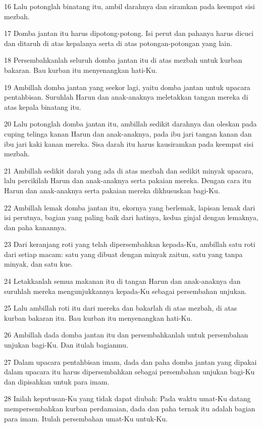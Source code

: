 \par 16 Lalu potonglah binatang itu, ambil darahnya dan siramkan pada keempat sisi mezbah.
\par 17 Domba jantan itu harus dipotong-potong. Isi perut dan pahanya harus dicuci dan ditaruh di atas kepalanya serta di atas potongan-potongan yang lain.
\par 18 Persembahkanlah seluruh domba jantan itu di atas mezbah untuk kurban bakaran. Bau kurban itu menyenangkan hati-Ku.
\par 19 Ambillah domba jantan yang seekor lagi, yaitu domba jantan untuk upacara pentahbisan. Suruhlah Harun dan anak-anaknya meletakkan tangan mereka di atas kepala binatang itu.
\par 20 Lalu potonglah domba jantan itu, ambillah sedikit darahnya dan oleskan pada cuping telinga kanan Harun dan anak-anaknya, pada ibu jari tangan kanan dan ibu jari kaki kanan mereka. Sisa darah itu harus kausiramkan pada keempat sisi mezbah.
\par 21 Ambillah sedikit darah yang ada di atas mezbah dan sedikit minyak upacara, lalu percikilah Harun dan anak-anaknya serta pakaian mereka. Dengan cara itu Harun dan anak-anaknya serta pakaian mereka dikhususkan bagi-Ku.
\par 22 Ambillah lemak domba jantan itu, ekornya yang berlemak, lapisan lemak dari isi perutnya, bagian yang paling baik dari hatinya, kedua ginjal dengan lemaknya, dan paha kanannya.
\par 23 Dari keranjang roti yang telah dipersembahkan kepada-Ku, ambillah satu roti dari setiap macam: satu yang dibuat dengan minyak zaitun, satu yang tanpa minyak, dan satu kue.
\par 24 Letakkanlah semua makanan itu di tangan Harun dan anak-anaknya dan suruhlah mereka mengunjukkannya kepada-Ku sebagai persembahan unjukan.
\par 25 Lalu ambillah roti itu dari mereka dan bakarlah di atas mezbah, di atas kurban bakaran itu. Bau kurban itu menyenangkan hati-Ku.
\par 26 Ambillah dada domba jantan itu dan persembahkanlah untuk persembahan unjukan bagi-Ku. Dan itulah bagianmu.
\par 27 Dalam upacara pentahbisan imam, dada dan paha domba jantan yang dipakai dalam upacara itu harus dipersembahkan sebagai persembahan unjukan bagi-Ku dan dipisahkan untuk para imam.
\par 28 Inilah keputusan-Ku yang tidak dapat diubah: Pada waktu umat-Ku datang mempersembahkan kurban perdamaian, dada dan paha ternak itu adalah bagian para imam. Itulah persembahan umat-Ku untuk-Ku.
